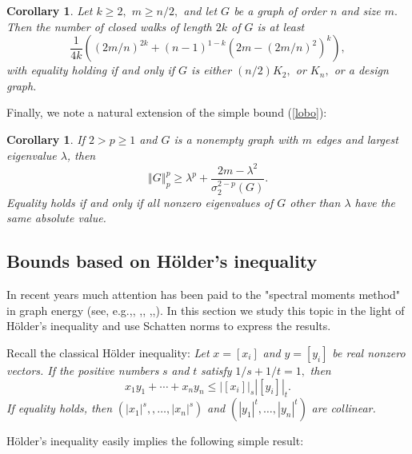 \documentclass[12pt]{article}%
\newtheorem{corollary}[theorem]{Corollary}
\begin{document}
\begin{corollary}
Let $k\geq2,$ $m\geq n/2,$ and let $G$ be a graph of order $n$ and size $m.$
Then the number of closed walks of length $2k$ of $G$ is at least
\[
\frac{1}{4k}\left(  \left(  2m/n\right)  ^{2k}+\left(  n-1\right)
^{1-k}\left(  2m-\left(  2m/n\right)  ^{2}\right)  ^{k}\right)  ,
\]
with equality holding if and only if $G$ is either $\left(  n/2\right)
K_{2},$ or $K_{n},$ or a design graph.
\end{corollary}

Finally, we note a natural extension of the simple bound (\ref{lobo}):

\begin{corollary}
If $2>p\geq1$ and $G$ is a nonempty graph with $m$ edges and largest
eigenvalue $\lambda$, then%
\[
\left\Vert G\right\Vert _{p}^{p}\geq\lambda^{p}+\frac{2m-\lambda^{2}}%
{\sigma_{2}^{2-p}\left(  G\right)  }.
\]
Equality holds if and only if all nonzero eigenvalues of $G$ other than
$\lambda$ have the same absolute value.
\end{corollary}

\subsection{\label{shin}Bounds based on H\"{o}lder's inequality}

In recent years much attention has been paid to the "spectral moments method"
in graph energy (see, e.g.,, \cite{PMR05},\cite{RaTi04},\cite{Zho04}%
,\cite{ZGPRM07},\cite{GLS12}). In this section we study this topic in the
light of H\"{o}lder's inequality and use Schatten norms to express the results.

Recall the classical H\"{o}lder inequality: \emph{Let }$x=\left[
x_{i}\right]  $\emph{ and }$y=\left[  y_{i}\right]  $\emph{ be real nonzero
vectors. If the positive numbers }$s$\emph{ and }$t$\emph{ satisfy
}$1/s+1/t=1,$ \emph{then }%
\begin{equation}
x_{1}y_{1}+\cdots+x_{n}y_{n}\leq\left\vert \left[  x_{i}\right]  \right\vert
_{s}\left\vert \left[  y_{i}\right]  \right\vert _{t}.\label{Holdin}%
\end{equation}
\emph{If equality holds, then }$\left(  \left\vert x_{1}\right\vert
^{s},,\ldots,\left\vert x_{n}\right\vert ^{s}\right)  $\emph{ and
}$(\left\vert y_{1}\right\vert ^{t},\ldots,\left\vert y_{n}\right\vert ^{t}%
)$\emph{ are collinear.}

H\"{o}lder's inequality easily implies the following simple result:
\end{document}

